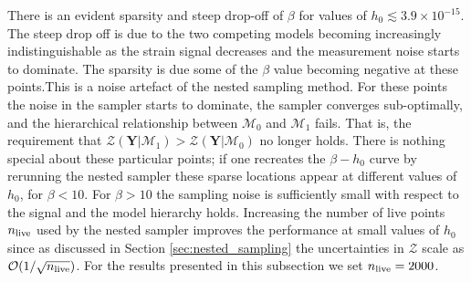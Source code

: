 \documentclass[fleqn,usenatbib,useAMS]{mnras}
\begin{document}
There is an evident sparsity and steep drop-off of $\beta$ for values of $h_0 \lesssim 3.9 \times10^{-15}$. The steep drop off is due to the two competing models becoming increasingly indistinguishable as the strain signal decreases and the measurement noise starts to dominate. The sparsity is due some of the $\beta$ value becoming negative at these points.This is a noise artefact of the nested sampling method. For these points the noise in the sampler starts to dominate, the sampler converges sub-optimally, and the hierarchical relationship between $\mathcal{M}_0$ and  $\mathcal{M}_1$ fails. That is, the requirement that $\mathcal{Z}(\boldsymbol{Y} | \mathcal{M}_1) > \mathcal{Z}(\boldsymbol{Y} | \mathcal{M}_0)$ no longer holds. There is nothing special about these particular points; if one recreates the $\beta - h_0$ curve by rerunning the nested sampler these sparse locations appear at different values of $h_0$, for $\beta < 10$. For $\beta > 10$ the sampling noise is sufficiently small with respect to the signal and the model hierarchy holds. Increasing the number of live points $n_{\rm live}$ used by the nested sampler improves the performance at small values of $h_0$ since as discussed in Section \ref{sec:nested_sampling} the uncertainties in $\mathcal{Z}$ scale as $\mathcal{O}(1/ \sqrt{n_{\rm live}})$. For the results presented in this subsection we set $n_{\rm live} =2000$. 
\end{document}
